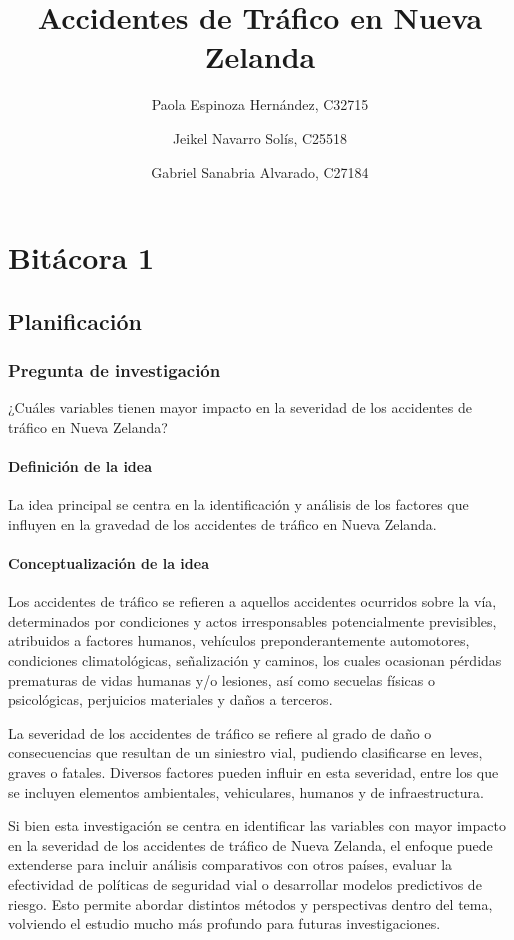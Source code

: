 \documentclass{book}
\title{Accidentes de Tráfico en Nueva Zelanda}
\author{Paola Espinoza Hernández, C32715 \and Jeikel Navarro Solís, C25518 \and Gabriel Sanabria Alvarado, C27184}
\begin{document}
\maketitle

\chapter*{Bitácora 1}

\section{Planificación}

\subsection{Pregunta de investigación}
¿Cuáles variables tienen mayor impacto en la severidad de los accidentes de tráfico en Nueva Zelanda?

\subsubsection{Definición de la idea}

La idea principal se centra en la identificación y análisis de los factores que influyen en la gravedad de los accidentes de tráfico en Nueva Zelanda. 

\subsubsection{Conceptualización de la idea}

Los accidentes de tráfico se refieren a aquellos accidentes ocurridos sobre la vía, determinados por condiciones y actos irresponsables potencialmente previsibles, atribuidos a factores humanos, vehículos preponderantemente automotores, condiciones climatológicas, señalización y caminos, los cuales ocasionan pérdidas prematuras de vidas humanas y/o lesiones, así como secuelas físicas o psicológicas, perjuicios materiales y daños a terceros.

La severidad de los accidentes de tráfico se refiere al grado de daño o consecuencias que resultan de un siniestro vial, pudiendo clasificarse en leves, graves o fatales. Diversos factores pueden influir en esta severidad, entre los que se incluyen elementos ambientales, vehiculares, humanos y de infraestructura.

Si bien esta investigación se centra en identificar las variables con mayor impacto en la severidad de los accidentes de tráfico de Nueva Zelanda, el enfoque puede extenderse para incluir análisis comparativos con otros países, evaluar la efectividad de políticas de seguridad vial o desarrollar modelos predictivos de riesgo. Esto permite abordar distintos métodos y perspectivas dentro del tema, volviendo el estudio mucho más profundo para futuras investigaciones.
\end{document}
